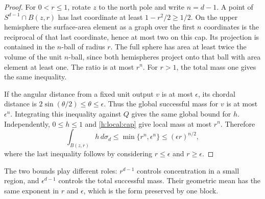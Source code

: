 \begin{proof}
For \(0<r\le1\), rotate \(z\) to the north pole and write
\(n=d-1\). A point of \(S^{d-1}\cap B(z,r)\) has last coordinate at
least \(1-r^2/2\ge1/2\). On the upper hemisphere the surface-area
element as a graph over the first \(n\) coordinates is the reciprocal
of that last coordinate, hence at most two on this cap. Its projection
is contained in the \(n\)-ball of radius \(r\). The full sphere has
area at least twice the volume of the unit \(n\)-ball, since both
hemispheres project onto that ball with area element at least one.
The ratio is at most \(r^n\). For \(r>1\), the total mass one gives
the same inequality.

If the angular distance from a fixed unit output \(v\) is at most
\(\epsilon\), its chordal distance is
\(2\sin(\theta/2)\le\theta\le\epsilon\). Thus the global successful
mass for \(v\) is at most \(\epsilon^n\). Integrating this inequality
against \(Q\) gives the same global bound for \(h\). Independently,
\(0\le h\le1\) and \eqref{h:local:cap} give local mass at most \(r^n\).
Therefore
\[
 \int_{B(z,r)}h\,d\sigma_d
 \le\min\{r^n,\epsilon^n\}\le(\epsilon r)^{n/2},
\]
where the last inequality follows by considering \(r\le\epsilon\)
and \(r\ge\epsilon\).
\end{proof}

The two bounds play different roles: \(r^{d-1}\) controls
concentration in a small region, and \(\epsilon^{d-1}\) controls the
total successful mass. Their geometric mean has the same exponent in
\(r\) and \(\epsilon\), which is the form preserved by one block.
